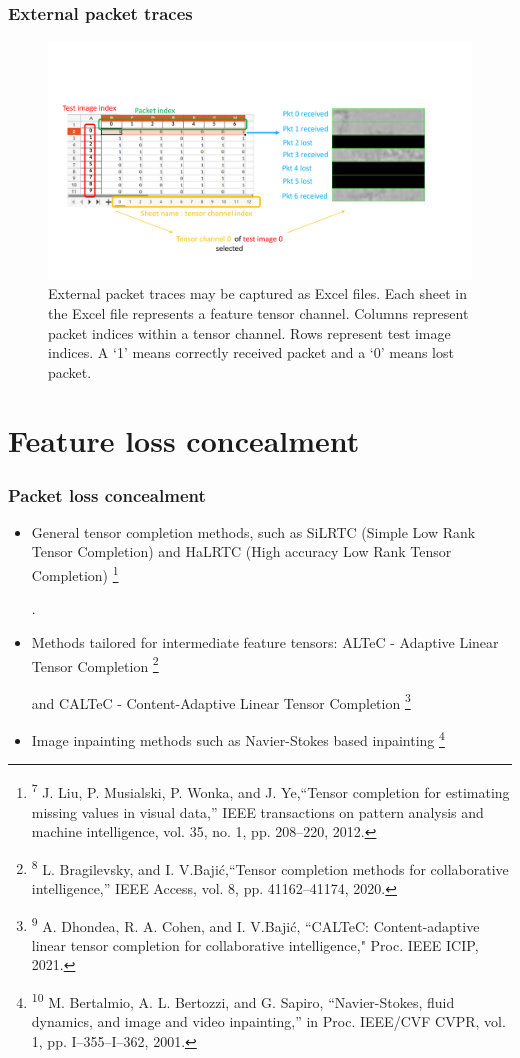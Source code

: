 \documentclass[aspectratio=169]{beamer}
\newcommand\blfootnote[1]{%
	\begingroup
	\renewcommand\thefootnote{}\footnote{#1}%
	\addtocounter{footnote}{-1}%
	\endgroup
}
\begin{document}
\begin{frame}
\frametitle{External packet traces}
       \begin{figure}
        \centering
        \includegraphics[scale=0.4,viewport=20 60 840 400,clip]{externalpkt.pdf}
        \caption{External packet traces may be captured as Excel files. Each sheet in the Excel file represents a feature tensor channel. Columns represent packet indices within a tensor channel. Rows represent test image indices. A `1' means correctly received packet and a `0' means lost packet.}
        \label{fig:extpkt}
    \end{figure}
\end{frame}

\section{Feature loss concealment}
\begin{frame}
	\frametitle{Packet loss concealment}
	\begin{itemize}
		\item General tensor completion methods, such as SiLRTC (Simple Low Rank Tensor Completion) and HaLRTC (High accuracy Low Rank Tensor Completion) \cite{liu2012tensor}\blfootnote{\tiny \textsuperscript{7} J. Liu, P. Musialski, P. Wonka, and J. Ye,``Tensor completion for estimating missing values in visual data,” IEEE transactions on pattern analysis and machine intelligence, vol. 35, no. 1, pp. 208–220, 2012.}.
		\item Methods tailored for intermediate feature tensors: ALTeC - Adaptive Linear Tensor Completion \cite{Bragile2020} \blfootnote{\tiny \textsuperscript{8} L. Bragilevsky, and I. V.Bajić,``Tensor completion methods for collaborative intelligence,” IEEE Access, vol. 8, pp. 41162–41174, 2020.} and CALTeC - Content-Adaptive Linear Tensor Completion \cite{CALTeC_ICIP_2021} \blfootnote{\tiny \textsuperscript{9} A. Dhondea, R. A. Cohen, and I. V.Bajić, ``CALTeC: Content-adaptive linear tensor completion for collaborative intelligence," Proc. IEEE ICIP, 2021.}
		\item Image inpainting methods such as Navier-Stokes based inpainting \cite{navierstokes} \blfootnote{\tiny \textsuperscript{10} M. Bertalmio, A. L. Bertozzi, and G. Sapiro, ``Navier-Stokes, fluid dynamics, and image and video inpainting,” in Proc. IEEE/CVF CVPR, vol. 1, pp. I–355–I–362, 2001.}
	\end{itemize}
\end{frame}
\end{document}
